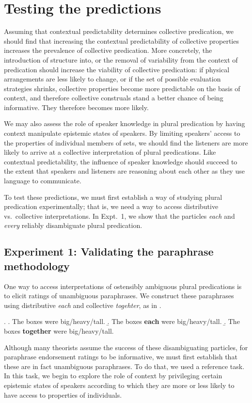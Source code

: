 \documentclass[linguex]{sp}
\begin{document}
\section{Testing the predictions}

Assuming that contextual predictability determines collective predication, we should find that increasing the contextual predictability of collective properties increases the prevalence of collective predication. More concretely, the introduction of structure into, or the removal of variability from the context of predication should increase the viability of collective predication: if physical arrangements are less likely to change, or if the set of possible evaluation strategies shrinks, collective properties become more predictable on the basis of context, and therefore collective construals stand a better chance of being informative. They therefore becomes more likely. 

We may also assess the role of speaker knowledge in plural predication by having context manipulate epistemic states of speakers. By limiting speakers' access to the properties of individual members of sets, we should find the listeners are more likely to arrive at a collective interpretation of plural predications. Like contextual predictability, the influence of speaker knowledge should succeed to the extent that speakers and listeners are reasoning about each other as they use language to communicate.

To test these predictions, we must first establish a way of studying plural predication experimentally; that is, we need a way to access distributive vs.~collective interpretations. In Expt.~1, we show that the particles \emph{each} and \emph{every} reliably disambiguate plural predication.


\subsection{Experiment 1: Validating the paraphrase methodology}

One way to access interpretations of ostensibly ambiguous plural predications is to elicit ratings of unambiguous paraphrases. We construct these paraphrases using distributive \emph{each} and collective \emph{togehter}, as in \Next.

\ex. \a. The boxes were big/heavy/tall.
\b.\label{each} The boxes \textbf{each} were big/heavy/tall.
\b.\label{together} The boxes \textbf{together} were big/heavy/tall.

Although many theorists assume the success of these disambiguating particles, for paraphrase endorsement ratings to be informative, we must first establish that these are in fact unambiguous paraphrases. To do that, we used a reference task. In this task, we begin to explore the role of context by privileging certain epistemic states of speakers according to which they are more or less likely to have access to properties of individuals.
\end{document}
